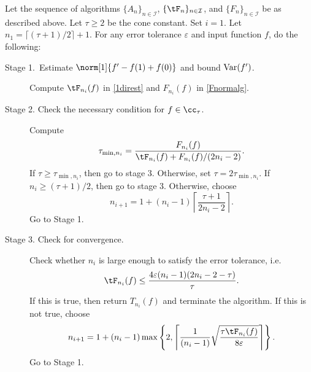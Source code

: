 \begin{algo} \label{multistageintegalgo}
Let the sequence of algorithms $\{A_n\}_{n\in \mathcal{I}}$, $\{\tF_n\}_{n\in \mathcal{I}}$, and $\{F_n\}_{n\in \mathcal{I}}$ be as described above.
Let $\tau\ge2$ be the cone constant. Set $i=1$. Let $n_1=\lceil(\tau+1)/2\rceil+1$. For any error tolerance $\varepsilon$ and input function $f$, do the following:
\begin{description}
\item[Stage 1.\ Estimate {$\norm[1]{f'-f(1)+f(0)}$} and bound {$\operatorname{Var}(f')$}.] Compute $\tF_{n_i}(f)$ in \eqref{1direst} and $F_{n_i}(f)$ in \eqref{Fnormalg}.

\item[Stage 2. Check the necessary condition for $f \in \cc_{\tau}$.] Compute
    \begin{align*}
     \tau_{\min,n_i} =  \frac{F_{n_i}(f)}{\tF_{n_i}(f)+F_{n_i}(f)/(2n_i-2)}.
    \end{align*}
If $\tau \ge \tau_{\min,n_i}$, then go to stage 3.  Otherwise, set $\tau = 2\tau_{\min,n_i}$.  If $n_i \ge (\tau+1)/2$, then go to stage 3.  Otherwise, choose
$$
n_{i+1}=1+ (n_i-1)\left\lceil\frac{\tau+1}{2n_i-2}\right\rceil.
$$
Go to Stage 1.

\item[Stage 3. Check for convergence.] Check whether $n_i$ is large enough to satisfy the error tolerance, i.e.
    \begin{equation*}
     \tF_{n_i}(f) \le \frac{4\varepsilon(n_i-1)(2n_i-2 - \tau)}{\tau}.
    \end{equation*}
If this is true, then return $T_{n_i}(f)$ and terminate the algorithm.   If this is not true, choose
$$
n_{i+1}=1+ (n_i-1)\max\left\{2,\left\lceil\frac{1}{(n_i-1)}\sqrt{\frac{\tau \tF_{n_i}(f)}{8\varepsilon}}\right\rceil\right\}.
$$
Go to Stage 1.
\end{description}
\end{algo}

